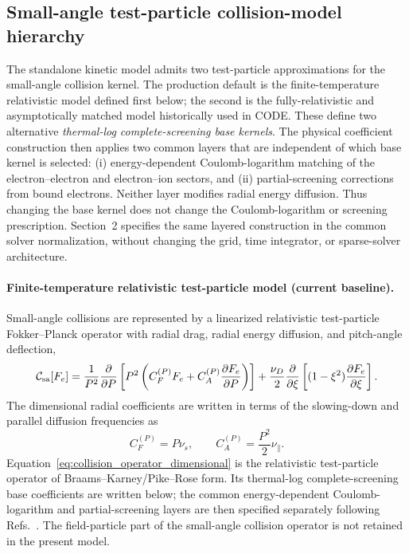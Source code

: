 \documentclass[11pt]{article}
\begin{document}
\subsection{Small-angle test-particle collision-model hierarchy}

The standalone kinetic model admits two test-particle approximations for the
small-angle collision kernel.  The production default is the finite-temperature
relativistic model defined first below; the second is the fully-relativistic and
asymptotically matched model historically used in CODE.  These define two alternative
\emph{thermal-log complete-screening base kernels}.  The physical coefficient construction
then applies two common layers that are independent of which base kernel is selected:
(i) energy-dependent Coulomb-logarithm matching of the electron--electron and
electron--ion sectors, and (ii) partial-screening corrections from bound electrons.
Neither layer modifies radial energy diffusion.  Thus changing the base kernel does not
change the Coulomb-logarithm or screening prescription.  Section~2 specifies the same
layered construction in the common solver normalization, without changing the grid, time
integrator, or sparse-solver architecture.

\paragraph{Finite-temperature relativistic test-particle model (current baseline).}
Small-angle collisions are represented by a linearized relativistic test-particle
Fokker--Planck operator with radial drag, radial energy diffusion, and pitch-angle
deflection,
\begin{equation}
 \mathcal C_{\rm sa}[F_e]
 =\frac{1}{P^2}\frac{\partial}{\partial P}
  \left[
   P^2\left(
      C_F^{(P)} F_e
      + C_A^{(P)}\frac{\partial F_e}{\partial P}
   \right)
  \right]
 +\frac{\nu_D}{2}\frac{\partial}{\partial\xi}
  \left[(1-\xi^2)\frac{\partial F_e}{\partial\xi}\right].
 \label{eq:collision_operator_dimensional}
\end{equation}
The dimensional radial coefficients are written in terms of the slowing-down and
parallel diffusion frequencies as
\begin{equation}
 C_F^{(P)}=P\nu_s,
 \qquad
 C_A^{(P)}=\frac{P^2}{2}\nu_\parallel.
 \label{eq:dimensional_collision_coeffs}
\end{equation}
Equation~\eqref{eq:collision_operator_dimensional} is the relativistic test-particle
operator of Braams--Karney/Pike--Rose form.  Its thermal-log complete-screening base
coefficients are written below; the common energy-dependent Coulomb-logarithm and
partial-screening layers are then specified separately following
Refs.~\cite{BraamsKarney1989,PikeRose2014,Hesslow2018Collision}.
The field-particle part of the small-angle collision operator is not retained in the
present model.
\end{document}
